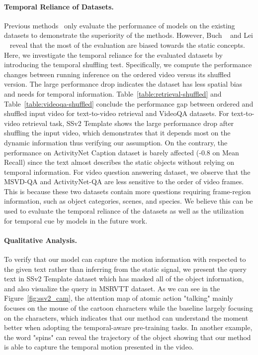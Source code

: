 \documentclass[10pt,twocolumn,letterpaper]{article}
\begin{document}
\paragraph{Temporal Reliance of Datasets.}
Previous methods~\cite{li2022alpro, lei2021clipbert, ge2022bridgeformer} only evaluate the performance of models on the existing datasets to demonstrate the superiority of the methods. However, Buch \etal~\cite{buch2022atp} and Lei \etal~\cite{lei2022singularity} reveal that the most of the evaluation are biased towards the static concepts. Here, we investigate the temporal reliance for the evaluated datasets by introducing the temporal shuffling test. Specifically, we compute the performance changes between running inference on the ordered video versus its shuffled version. The large performance drop indicates the dataset has less spatial bias and needs for temporal information. Table~\ref{table:retrieval-shuffled} and Table~\ref{table:videoqa-shuffled} conclude the performance gap between ordered and shuffled input video for text-to-video retrieval and VideoQA datasets. For text-to-video retrieval task, SSv2 Template shows the large performance drop after shuffling the input video, which demonstrates that it depends most on the dynamic information thus verifying our assumption. On the contrary, the performance on ActivityNet Caption dataset is barely affected (-0.8 on Mean Recall) since the text almost describes the static objects without relying on temporal information. For video question answering dataset, we observe that the MSVD-QA and ActivityNet-QA are less sensitive to the order of video frames. This is because these two datasets contain more questions requiring frame-region information, such as object categories, scenes, and species. We believe this can be used to evaluate the temporal reliance of the datasets as well as the utilization for temporal cue by models in the future work. 

\paragraph{Qualitative Analysis.}
To verify that our model can capture the motion information with respected to the given text rather than inferring from the static signal, we present the query text in SSv2 Template dataset which has masked all of the object information, and also visualize the query in MSRVTT dataset. As we can see in the Figure~\ref{fig:ssv2_cam}, the attention map of atomic action "talking" mainly focuses on the mouse of the cartoon characters while the baseline largely focusing on the characters, which indicates that our method can understand the moment better when adopting the temporal-aware pre-training tasks. In another example, the word "spins" can reveal the trajectory of the object showing that our method is able to capture the temporal motion presented in the video.
\end{document}
